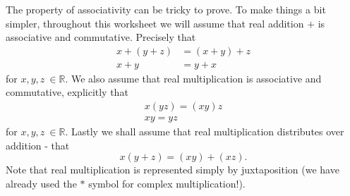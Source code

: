 The property of associativity can be tricky to prove. To make things a bit simpler, throughout this worksheet we will assume that real addition $+$ is associative and commutative. Precisely that 
\begin{align}\label{aasoc}
 x + (y+ z) &= (x + y) + z \\
 x+y&=y+x \label{acom}
\end{align}
for $x,y,z\:\in \mathbb{R}$.
We also assume that real multiplication is associative and commutative, explicitly that 
\begin{align}\label{masoc}
 x (yz)=(xy)z \\
 xy=yz \label{mcom}
\end{align}
for $x,y,z\:\in \mathbb{R}$. 
Lastly we shall assume that real multiplication distributes over addition - that
\begin{equation}\label{mdist}
 x  (y+z)=(xy)+(xz).
\end{equation}
Note that real multiplication is represented simply by juxtaposition (we have already used the $*$ symbol for complex multiplication!).

